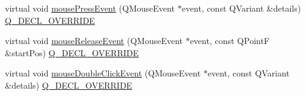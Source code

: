 \begin{DoxyCompactItemize}
\item 
virtual void \hyperlink{class_q_c_p_text_element_ad7b2c98355e3d2f912574b74fcee0574}{mouse\+Press\+Event} (Q\+Mouse\+Event $\ast$event, const Q\+Variant \&details) \hyperlink{qcustomplot_8hh_a42cc5eaeb25b85f8b52d2a4b94c56f55}{Q\+\_\+\+D\+E\+C\+L\+\_\+\+O\+V\+E\+R\+R\+I\+DE}
\item 
virtual void \hyperlink{class_q_c_p_text_element_acfcbaf9b1da18745e72726aafb39c855}{mouse\+Release\+Event} (Q\+Mouse\+Event $\ast$event, const Q\+PointF \&start\+Pos) \hyperlink{qcustomplot_8hh_a42cc5eaeb25b85f8b52d2a4b94c56f55}{Q\+\_\+\+D\+E\+C\+L\+\_\+\+O\+V\+E\+R\+R\+I\+DE}
\item 
virtual void \hyperlink{class_q_c_p_text_element_a2272ff775ab385f612e9fd39773de7c0}{mouse\+Double\+Click\+Event} (Q\+Mouse\+Event $\ast$event, const Q\+Variant \&details) \hyperlink{qcustomplot_8hh_a42cc5eaeb25b85f8b52d2a4b94c56f55}{Q\+\_\+\+D\+E\+C\+L\+\_\+\+O\+V\+E\+R\+R\+I\+DE}
\end{DoxyCompactItemize}
